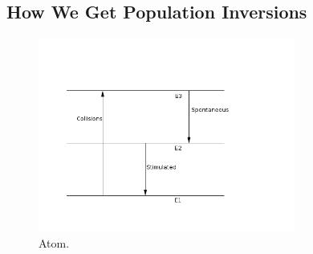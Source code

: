 \documentclass{article}
\begin{document}
\subsection{ How We Get Population Inversions }

\begin{figure}
    \centering
    \includegraphics[width=0.75\textwidth]{Atom.png}
    \caption{Atom.}
    \label{fig:atom}
\end{figure}
\end{document}
